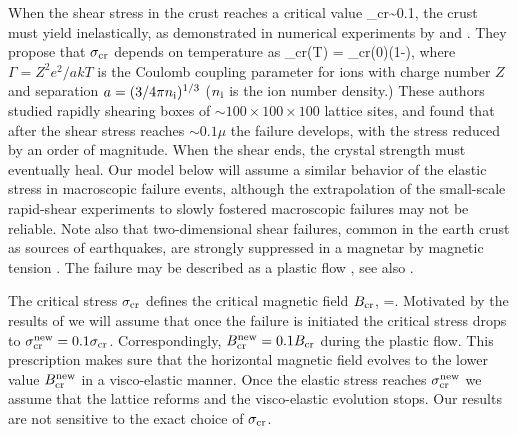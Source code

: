 When the shear stress in the crust reaches a critical value 
\beq
\sigma_{\rm cr}\sim 0.1\mu,
\eeq
the crust must yield inelastically, as demonstrated in numerical experiments by 
\citet{2009PhRvL.102s1102H} and 
\citet{2010MNRAS.407L..54C}.
They propose that $\sigma_{\rm cr}$ depends on temperature as
\beq\label{shearstress}
\sigma_{\rm cr}(T) = \sigma_{\rm cr}(0)\left(1-\right), 
\eeq
where $\Gamma=Z^2 e^2/akT$ is the Coulomb coupling parameter for ions with charge
number $Z$ and separation $a=(3/4\pi n_{\rm i})^{1/3}$ ($n_{\rm i}$ is the ion number density.)
These authors studied rapidly shearing boxes of $\sim 100\times100\times 100$ lattice sites, and found that after the shear stress reaches $\sim 0.1\mu$ the failure develops, with the stress reduced by an order of magnitude.
When the shear ends, the crystal strength must eventually heal.
Our model below will assume a similar behavior of the elastic stress in macroscopic failure events, although the extrapolation of the small-scale rapid-shear experiments to slowly fostered macroscopic failures may not be reliable.
Note also that two-dimensional shear failures, common in the earth crust as sources of earthquakes, are strongly suppressed in a magnetar by magnetic tension \citep{2012MNRAS.427.1574L}. The failure may be described as a plastic flow \citep{2014ApJ...794L..24B}, see also \citet{2003ApJ...595..342J}.

The critical stress $\sigma_{\rm cr}$ defines the critical magnetic field $B_{\rm cr}$,
\beq
  =\sigcr.
\eeq
Motivated by the results of \citet{2009PhRvL.102s1102H}
we will
assume that once the failure
is initiated the critical stress  drops
to $\sigma_{\rm cr}^{\rm new}=0.1\sigma_{\rm cr}$. 
Correspondingly, $B_{\rm cr}^{\rm new}=0.1B_{\rm cr}$ during the plastic flow.
This prescription makes sure that the horizontal magnetic field evolves to the lower value $B_{\rm cr}^{\rm new}$ in a visco-elastic manner. 
Once the elastic stress reaches $\sigma_{\rm cr}^{\rm new}$ we assume that the lattice reforms and the visco-elastic evolution stops.
Our results are not sensitive to the exact choice of $\sigma_{\rm cr}$.

